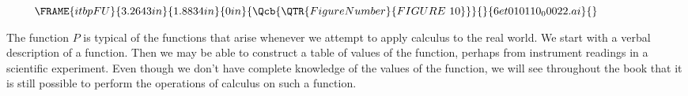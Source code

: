 \documentclass{sebase}
\begin{document}
\begin{enumerate}
\vspace{12pt}\hskip-180pt\hfil%
$\hspace*{24pt}%
\FRAME{itbpFU}{3.2643in}{1.8834in}{0in}{\Qcb{\QTR{FigureNumber}{FIGURE\ 10}}%
}{}{6et010110_00022.ai}{\special{language "Scientific Word";type
"GRAPHIC";maintain-aspect-ratio TRUE;display "USEDEF";valid_file "F";width
3.2643in;height 1.8834in;depth 0in;original-width 3.2368in;original-height
1.8568in;cropleft "0";croptop "1";cropright "1";cropbottom "0";filename
'graphics/6et010110_00022.ai';file-properties "XNPEU";}}$%
\vspace{12pt}\hfil%

\quad The function $P$ is typical of the functions that arise
whenever we attempt to apply calculus to the real world. We start with a
verbal description of a function. Then we may be able to construct a table
of values of the function, perhaps from instrument readings in a scientific
experiment. Even though we don't have complete knowledge of the values of
the function, we will see throughout the book that it is still possible to
perform the operations of calculus on such a function.%
\enlargethispage{\baselineskip}%


\end{enumerate}
\end{document}
